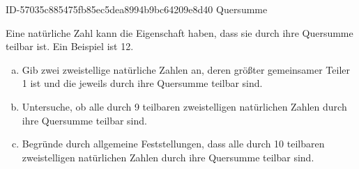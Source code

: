 \begin{exercise}
      {ID-57035c885475fb85ec5dea8994b9bc64209e8d40}
      {Quersumme}
  \ifproblem\problem\par
    Eine natürliche Zahl kann die Eigenschaft haben, dass sie durch ihre Quersumme
    teilbar ist. Ein Beispiel ist 12.
    \begin{enumerate}[a)]
      \item Gib zwei zweistellige natürliche Zahlen an, deren größter gemeinsamer
            Teiler 1 ist und die jeweils durch ihre Quersumme teilbar sind.
      \item Untersuche, ob alle durch 9 teilbaren zweistelligen natürlichen Zahlen
            durch ihre Quersumme teilbar sind.
      \item Begründe durch allgemeine Feststellungen, dass alle durch 10 teilbaren
            zweistelligen natürlichen Zahlen durch ihre Quersumme teilbar sind.
    \end{enumerate}
  \fi
\end{exercise}
